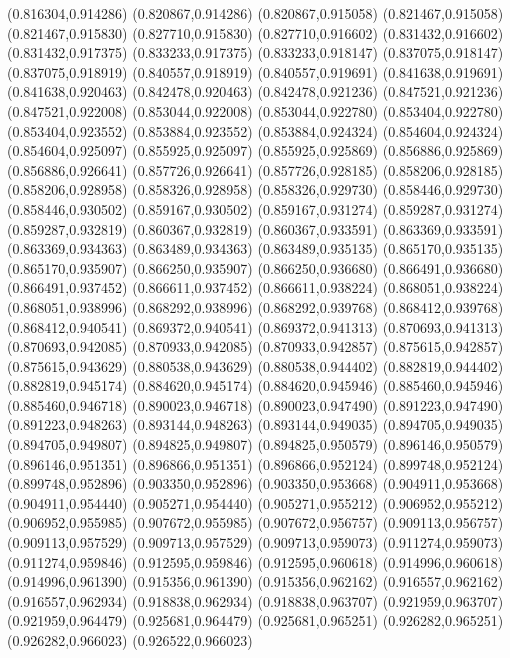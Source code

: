 (0.816304,0.914286)
(0.820867,0.914286)
(0.820867,0.915058)
(0.821467,0.915058)
(0.821467,0.915830)
(0.827710,0.915830)
(0.827710,0.916602)
(0.831432,0.916602)
(0.831432,0.917375)
(0.833233,0.917375)
(0.833233,0.918147)
(0.837075,0.918147)
(0.837075,0.918919)
(0.840557,0.918919)
(0.840557,0.919691)
(0.841638,0.919691)
(0.841638,0.920463)
(0.842478,0.920463)
(0.842478,0.921236)
(0.847521,0.921236)
(0.847521,0.922008)
(0.853044,0.922008)
(0.853044,0.922780)
(0.853404,0.922780)
(0.853404,0.923552)
(0.853884,0.923552)
(0.853884,0.924324)
(0.854604,0.924324)
(0.854604,0.925097)
(0.855925,0.925097)
(0.855925,0.925869)
(0.856886,0.925869)
(0.856886,0.926641)
(0.857726,0.926641)
(0.857726,0.928185)
(0.858206,0.928185)
(0.858206,0.928958)
(0.858326,0.928958)
(0.858326,0.929730)
(0.858446,0.929730)
(0.858446,0.930502)
(0.859167,0.930502)
(0.859167,0.931274)
(0.859287,0.931274)
(0.859287,0.932819)
(0.860367,0.932819)
(0.860367,0.933591)
(0.863369,0.933591)
(0.863369,0.934363)
(0.863489,0.934363)
(0.863489,0.935135)
(0.865170,0.935135)
(0.865170,0.935907)
(0.866250,0.935907)
(0.866250,0.936680)
(0.866491,0.936680)
(0.866491,0.937452)
(0.866611,0.937452)
(0.866611,0.938224)
(0.868051,0.938224)
(0.868051,0.938996)
(0.868292,0.938996)
(0.868292,0.939768)
(0.868412,0.939768)
(0.868412,0.940541)
(0.869372,0.940541)
(0.869372,0.941313)
(0.870693,0.941313)
(0.870693,0.942085)
(0.870933,0.942085)
(0.870933,0.942857)
(0.875615,0.942857)
(0.875615,0.943629)
(0.880538,0.943629)
(0.880538,0.944402)
(0.882819,0.944402)
(0.882819,0.945174)
(0.884620,0.945174)
(0.884620,0.945946)
(0.885460,0.945946)
(0.885460,0.946718)
(0.890023,0.946718)
(0.890023,0.947490)
(0.891223,0.947490)
(0.891223,0.948263)
(0.893144,0.948263)
(0.893144,0.949035)
(0.894705,0.949035)
(0.894705,0.949807)
(0.894825,0.949807)
(0.894825,0.950579)
(0.896146,0.950579)
(0.896146,0.951351)
(0.896866,0.951351)
(0.896866,0.952124)
(0.899748,0.952124)
(0.899748,0.952896)
(0.903350,0.952896)
(0.903350,0.953668)
(0.904911,0.953668)
(0.904911,0.954440)
(0.905271,0.954440)
(0.905271,0.955212)
(0.906952,0.955212)
(0.906952,0.955985)
(0.907672,0.955985)
(0.907672,0.956757)
(0.909113,0.956757)
(0.909113,0.957529)
(0.909713,0.957529)
(0.909713,0.959073)
(0.911274,0.959073)
(0.911274,0.959846)
(0.912595,0.959846)
(0.912595,0.960618)
(0.914996,0.960618)
(0.914996,0.961390)
(0.915356,0.961390)
(0.915356,0.962162)
(0.916557,0.962162)
(0.916557,0.962934)
(0.918838,0.962934)
(0.918838,0.963707)
(0.921959,0.963707)
(0.921959,0.964479)
(0.925681,0.964479)
(0.925681,0.965251)
(0.926282,0.965251)
(0.926282,0.966023)
(0.926522,0.966023)
